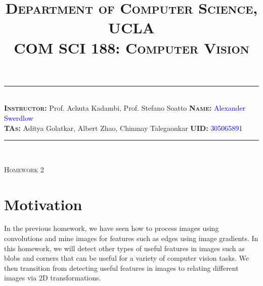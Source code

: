 \documentclass[answers]{exam}
\title{\normalfont \normalsize
\textsc{{Department of Computer Science, UCLA \\
COM SCI 188: Computer Vision}}
\date{\vspace{-12ex}}
}
\newcommand{\myinput}[1]{\textcolor{blue}{#1}}
\begin{document}
\maketitle
\rule{\linewidth}{0.8pt} \\[6pt] 
\noindent
\large\textbf{\textsc{Instructor:}} Prof. Achuta Kadambi, Prof. Stefano Soatto \hfill \large\textbf{\textsc{Name:}} \myinput{Alexander Swerdlow}\\
\large\textbf{\textsc{TAs:}} Aditya Golatkar, Albert Zhao, Chinmay Talegaonkar \hfill 
\large\textbf{\textsc{UID:}} \myinput{305065891}
\rule{\linewidth}{0.8pt} \\[6pt] 

\begin{center}
{\textsc{Homework 2}} 
\end{center}


\begin{table}[h]
\centering
{}
\caption*{}
\label{}
\end{table}

\newpage

\section*{Motivation}

In the previous homework, we have seen how to process images using convolutions and mine images for features such as edges using image gradients. In this homework, we will detect other types of useful features in images such as blobs and corners that can be useful for a variety of computer vision tasks. We then transition from detecting useful features in images to relating different images via 2D transformations.
\end{document}
